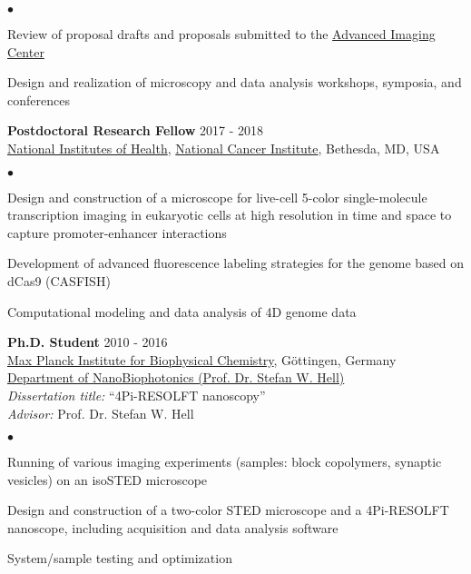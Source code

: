 \documentclass[margin,line]{res}
\newenvironment{list2}{
  \begin{list}{$\bullet$}{%
      \setlength{\itemsep}{0in}
      \setlength{\parsep}{0in} \setlength{\parskip}{0in}
      \setlength{\topsep}{0in} \setlength{\partopsep}{0in} 
      \setlength{\leftmargin}{0.2in}}}{\end{list}}
\begin{document}
\begin{resume}
\begin{list2}
\item Review of proposal drafts and proposals submitted to the \href{https://www.aicjanelia.org/}{Advanced Imaging Center}
\item Design and realization of microscopy and data analysis workshops, symposia, and conferences
\end{list2}
\vspace*{-1mm}
{\bf Postdoctoral Research Fellow} \hfill {2017 - 2018}\\
\href{https://www.nih.gov/}{National Institutes of Health}, \href{https://www.cancer.gov/}{National Cancer Institute}, Bethesda, MD, USA\\
\vspace*{-3mm}
\begin{list2}
\vspace*{-1mm}
\item Design and construction of a microscope for live-cell 5-color single-molecule transcription imaging in eukaryotic cells at high resolution in time and space to capture promoter-enhancer interactions 
\item Development of advanced fluorescence labeling strategies for the genome based on dCas9 (CASFISH)
\item Computational modeling and data analysis of 4D genome data
\end{list2}
\clearpage
{\bf Ph.D. Student} \hfill {2010 - 2016}\\
\href{https://www.mpinat.mpg.de/en}{Max Planck Institute for Biophysical Chemistry}, Göttingen, Germany\\
\href{http://www.4pi.de/}{Department of NanoBiophotonics (Prof. Dr. Stefan W. Hell)}\\
{\it Dissertation title:} “4Pi-RESOLFT nanoscopy”\\
{\it Advisor:} Prof. Dr. Stefan W. Hell\\
\vspace*{-3mm}
\begin{list2}
\vspace*{-1mm}
\item Running of various imaging experiments (samples: block copolymers, synaptic vesicles) on an isoSTED microscope
\item Design and construction of a two-color STED microscope and a 4Pi-RESOLFT nanoscope, including acquisition and data analysis software
\item System/sample testing and optimization
\end{list2}

\end{resume}
\end{document}
